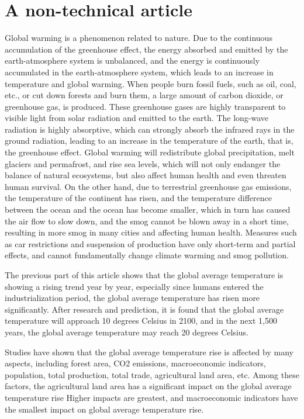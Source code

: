 \documentclass{apmcmthesis}
\begin{document}
\section{A non-technical article}
Global warming is a phenomenon related to nature. Due to the continuous accumulation of the greenhouse effect, the energy absorbed and emitted by the earth-atmosphere system is unbalanced, and the energy is continuously accumulated in the earth-atmosphere system, which leads to an increase in temperature and global warming. When people burn fossil fuels, such as oil, coal, etc., or cut down forests and burn them, a large amount of carbon dioxide, or greenhouse gas, is produced. These greenhouse gases are highly transparent to visible light from solar radiation and emitted to the earth. The long-wave radiation is highly absorptive, which can strongly absorb the infrared rays in the ground radiation, leading to an increase in the temperature of the earth, that is, the greenhouse effect. Global warming will redistribute global precipitation, melt glaciers and permafrost, and rise sea levels, which will not only endanger the balance of natural ecosystems, but also affect human health and even threaten human survival. On the other hand, due to terrestrial greenhouse gas emissions, the temperature of the continent has risen, and the temperature difference between the ocean and the ocean has become smaller, which in turn has caused the air flow to slow down, and the smog cannot be blown away in a short time, resulting in more smog in many cities and affecting human health. Measures such as car restrictions and suspension of production have only short-term and partial effects, and cannot fundamentally change climate warming and smog pollution.

The previous part of this article shows that the global average temperature is showing a rising trend year by year, especially since humans entered the industrialization period, the global average temperature has risen more significantly. After research and prediction, it is found that the global average temperature will approach 10 degrees Celsius in 2100, and in the next 1,500 years, the global average temperature may reach 20 degrees Celsius.

Studies have shown that the global average temperature rise is affected by many aspects, including forest area, CO2 emissions, macroeconomic indicators, population, total production, total trade, agricultural land area, etc. Among these factors, the agricultural land area has a significant impact on the global average temperature rise Higher impacts are greatest, and macroeconomic indicators have the smallest impact on global average temperature rise.
\end{document}

